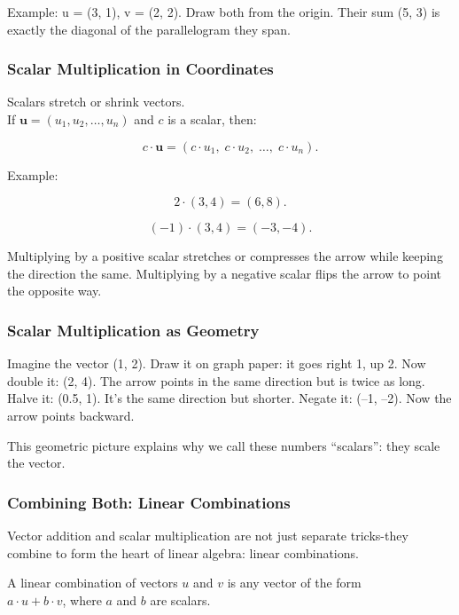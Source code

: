 \documentclass[
  letterpaper,
  DIV=11,
  numbers=noendperiod]{scrreprt}
\begin{document}
Example: u = (3, 1), v = (2, 2). Draw both from the origin. Their sum
(5, 3) is exactly the diagonal of the parallelogram they span.

\subsubsection{Scalar Multiplication in
Coordinates}\label{scalar-multiplication-in-coordinates}

Scalars stretch or shrink vectors.\\
If \(\mathbf{u} = (u_1, u_2, \ldots, u_n)\) and \(c\) is a scalar, then:

\[
c \cdot \mathbf{u} = (c \cdot u_1, \; c \cdot u_2, \; \ldots, \; c \cdot u_n).
\]

Example:

\[
2 \cdot (3, 4) = (6, 8).
\]

\[
(-1) \cdot (3, 4) = (-3, -4).
\]

Multiplying by a positive scalar stretches or compresses the arrow while
keeping the direction the same. Multiplying by a negative scalar flips
the arrow to point the opposite way.

\subsubsection{Scalar Multiplication as
Geometry}\label{scalar-multiplication-as-geometry}

Imagine the vector (1, 2). Draw it on graph paper: it goes right 1, up
2. Now double it: (2, 4). The arrow points in the same direction but is
twice as long. Halve it: (0.5, 1). It's the same direction but shorter.
Negate it: (--1, --2). Now the arrow points backward.

This geometric picture explains why we call these numbers ``scalars'':
they scale the vector.

\subsubsection{Combining Both: Linear
Combinations}\label{combining-both-linear-combinations}

Vector addition and scalar multiplication are not just separate
tricks-they combine to form the heart of linear algebra: linear
combinations.

A linear combination of vectors \(u\) and \(v\) is any vector of the
form\\
\(a \cdot u + b \cdot v\), where \(a\) and \(b\) are scalars.
\end{document}
